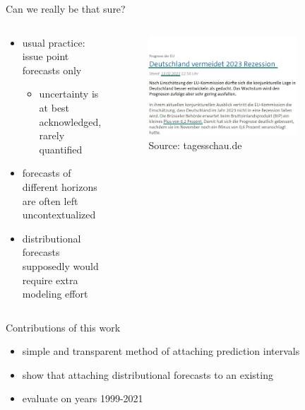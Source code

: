 \documentclass[en]{sdqbeamer}
\begin{document}
\begin{frame}[t]{Can we really be that sure?}

\begin{columns}
\begin{column}{0.4\textwidth}
   	\begin{itemize}
         \item usual practice: issue point forecasts only
         \begin{itemize}
	    \item uncertainty is at best acknowledged, rarely quantified
	\end{itemize}
        \item forecasts of different horizons are often left uncontextualized
        \item distributional forecasts supposedly would require extra modeling effort
    \end{itemize}
    \vspace{2cm}
\end{column}
\begin{column}{0.6\textwidth}
    \begin{figure}
        \centering
        \includegraphics[width=0.8\textwidth]{figures/recession_light_underlined_green_smaller_date.jpg} 
        \caption{Source: tagesschau.de}
        \label{fig:enter-label}
    \end{figure}     
\end{column}
\end{columns}
\end{frame}

\begin{frame}[t]{Contributions of this work}
\begin{itemize}
    \item simple and transparent method of attaching prediction intervals 
\item show that attaching distributional forecasts to an existing
\item evaluate on years 1999-2021
\end{itemize}
\end{frame}
\end{document}
